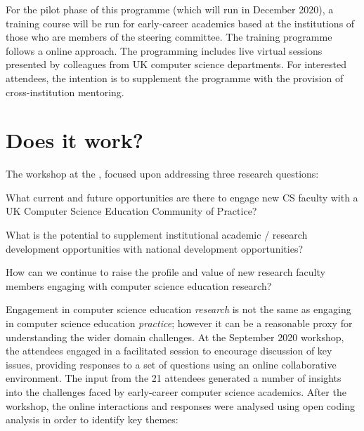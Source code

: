 \documentclass[sigconf]{acmart}
\begin{document}
For the pilot phase of this programme (which will run in December 2020), a training course will be run for early-career academics based at the institutions of those who are members of the steering committee. The training programme follows a online approach. The programming includes live virtual sessions presented by colleagues from UK computer science departments. For interested attendees,  the intention is to supplement the programme with the provision of cross-institution mentoring.

\section{Does it work?}	

The workshop  at the , focused upon addressing three research questions:
\begin{compactenum}[i)]
\item What current and future opportunities are there to engage new CS faculty with a UK Computer Science Education Community of Practice?
\item What is the potential to supplement institutional academic / research development opportunities with national development opportunities?
\item How can we continue to raise the profile and value of new research faculty members engaging with computer science education research?
\end{compactenum}
Engagement in computer science education {\emph{research}} is not the same as engaging in computer science education {\emph{practice}}; however it can be a reasonable proxy for understanding the wider domain challenges. At the September 2020 workshop, the attendees engaged in a facilitated session to encourage discussion of key issues, providing responses to a set of questions using an online collaborative environment. The input from the 21 attendees generated a number of insights into the challenges faced by early-career computer science academics. After the workshop, the online interactions and responses were analysed using open coding analysis in order to identify key themes:
\end{document}
